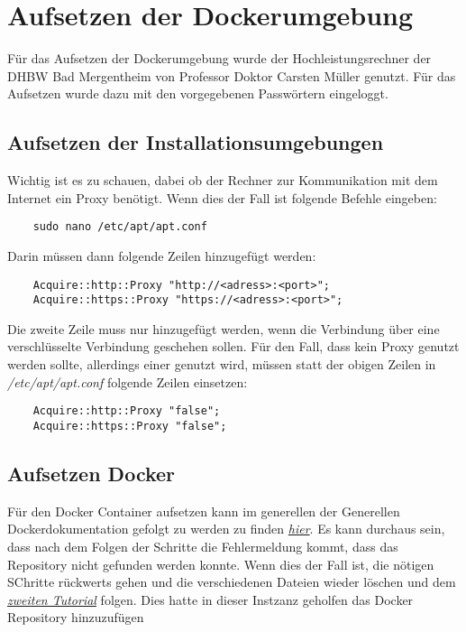 \chapter{Aufsetzen der Dockerumgebung}
Für das Aufsetzen der Dockerumgebung wurde der Hochleistungsrechner der DHBW Bad Mergentheim von Professor Doktor Carsten Müller genutzt. Für das Aufsetzen wurde dazu mit den vorgegebenen Passwörtern eingeloggt. 
\section{Aufsetzen der Installationsumgebungen}
Wichtig ist es zu schauen, dabei ob der Rechner zur Kommunikation mit dem Internet ein Proxy benötigt. Wenn dies der Fall ist folgende Befehle eingeben:

\begin{verbatim}
    sudo nano /etc/apt/apt.conf
\end{verbatim}
Darin müssen dann folgende Zeilen hinzugefügt werden:
\begin{verbatim}
    Acquire::http::Proxy "http://<adress>:<port>";
    Acquire::https::Proxy "https://<adress>:<port>";
\end{verbatim}
Die zweite Zeile muss nur hinzugefügt werden, wenn die Verbindung über eine verschlüsselte Verbindung geschehen sollen. Für den Fall, dass kein Proxy genutzt werden sollte, allerdings einer genutzt wird, müssen statt der obigen Zeilen in \textit{/etc/apt/apt.conf} folgende Zeilen einsetzen:
\begin{verbatim}
    Acquire::http::Proxy "false";
    Acquire::https::Proxy "false";
\end{verbatim}

\section{Aufsetzen Docker}
Für den Docker Container aufsetzen kann im generellen der Generellen Dockerdokumentation gefolgt zu werden zu finden \textit{\href{https://docs.docker.com/desktop/install/ubuntu/}{hier}}. Es kann durchaus sein, dass nach dem Folgen der Schritte die Fehlermeldung kommt, dass das Repository nicht gefunden werden konnte. Wenn dies der Fall ist, die nötigen SChritte rückwerts gehen und die verschiedenen Dateien wieder löschen und dem \textit{\href{https://www.digitalocean.com/community/tutorials/how-to-install-and-use-docker-on-ubuntu-20-04}{zweiten Tutorial}} folgen. Dies hatte in dieser Instzanz geholfen das Docker Repository hinzuzufügen